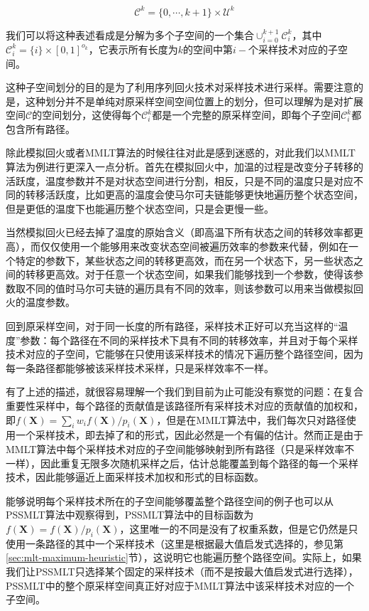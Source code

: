 \begin{equation}
	\mathscr{C}^{k}=\{0,\cdots,k+1\}\times\mathcal{U}^{k}
\end{equation}

\noindent 我们可以将这种表述看成是分解为多个子空间的一个集合$\cup^{k+1}_{i=0}\mathscr{C}^{k}_i$，其中$\mathscr{C}^{k}_i=\{i\}\times [0,1]^{o_k}$，它表示所有长度为$k$的空间中第$i-$个采样技术对应的子空间。

这种子空间划分的目的是为了利用序列回火技术对采样技术进行采样。需要注意的是，这种划分并不是单纯对原采样空间空间位置上的划分，但可以理解为是对扩展空间$\mathscr{C}$的空间划分，这使得每个$\mathscr{C}^{k}_i$都是一个完整的原采样空间，即每个子空间$\mathscr{C}^{k}_i$都包含所有路径。

除此模拟回火或者MMLT算法的时候往往对此是感到迷惑的，对此我们以MMLT算法为例进行更深入一点分析。首先在模拟回火中，加温的过程是改变分子转移的活跃度，温度参数并不是对状态空间进行分割，相反，只是不同的温度只是对应不同的转移活跃度，比如更高的温度会使马尔可夫链能够更快地遍历整个状态空间，但是更低的温度下也能遍历整个状态空间，只是会更慢一些。

当然模拟回火已经去掉了温度的原始含义（即高温下所有状态之间的转移效率都更高），而仅仅使用一个能够用来改变状态空间被遍历效率的参数来代替，例如在一个特定的参数下，某些状态之间的转移更高效，而在另一个状态下，另一些状态之间的转移更高效。对于任意一个状态空间，如果我们能够找到一个参数，使得该参数取不同的值时马尔可夫链的遍历具有不同的效率，则该参数可以用来当做模拟回火的温度参数。

回到原采样空间，对于同一长度的所有路径，采样技术正好可以充当这样的“温度”参数：每个路径在不同的采样技术下具有不同的转移效率，并且对于每个采样技术对应的子空间，它能够在只使用该采样技术的情况下遍历整个路径空间，因为每一条路径都能够被该采样技术采样，只是采样效率不一样。

有了上述的描述，就很容易理解一个我们到目前为止可能没有察觉的问题：在复合重要性采样中，每个路径的贡献值是该路径所有采样技术对应的贡献值的加权和，即$f(\mathbf{X})=\sum_i w_i f(\mathbf{X})/p_i(\mathbf{X})$，但是在MMLT算法中，我们每次只对路径使用一个采样技术，即去掉了和的形式，因此必然是一个有偏的估计。然而正是由于MMLT算法中每个采样技术对应的子空间能够映射到所有路径（只是采样效率不一样），因此重复无限多次随机采样之后，估计总能覆盖到每个路径的每一个采样技术，因此能够逼近上面采样技术加权和形式的目标函数。

能够说明每个采样技术所在的子空间能够覆盖整个路径空间的例子也可以从PSSMLT算法中观察得到，PSSMLT算法中的目标函数为$f(\mathbf{X})=f(\mathbf{X})/p_i(\mathbf{X})$，这里唯一的不同是没有了权重系数，但是它仍然是只使用一条路径的其中一个采样技术（这里是根据最大值启发式选择的，参见第\ref{sec:mlt-maximum-heuristic}节），这说明它也能遍历整个路径空间。实际上，如果我们让PSSMLT只选择某个固定的采样技术（而不是按最大值启发式进行选择），PSSMLT中的整个原采样空间真正好对应于MMLT算法中该采样技术对应的一个子空间。

